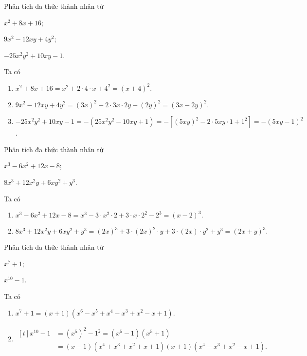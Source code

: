 \begin{vd}
	Phân tích đa thức thành nhân tử
	\begin{listEX}[3]
    	\item $x^2 + 8x + 16$;
    	\item $9x^2 - 12xy + 4y^2$;
    	\item $-25x^2y^2 + 10xy - 1$.
	\end{listEX}
	\loigiai 
	{
		Ta có
		\begin{enumerate}
			\item $x^2 + 8x + 16 = x^2 + 2 \cdot 4 \cdot x + 4^2 = (x+4)^2$.
			\item $9x^2 - 12xy + 4y^2 = (3x)^2 - 2 \cdot 3x \cdot 2y + (2y)^2 = (3x-2y)^2$.
			\item $-25x^2y^2 + 10xy - 1 = - \left(25x^2y^2 - 10xy + 1\right) = - \left[(5xy)^2 - 2 \cdot 5xy \cdot 1 + 1^2\right] = - (5xy - 1)^2$.
		\end{enumerate}
	}
\end{vd}



\begin{vd}
	Phân tích đa thức thành nhân tử
	\begin{listEX}[2]
    	\item $x^3 - 6x^2 + 12x - 8$;
    	\item $8x^3 + 12x^2y + 6xy^2 + y^3$.
	\end{listEX}
	\loigiai 
	{
		Ta có
		\begin{enumerate}
			\item $x^3 - 6x^2 + 12x - 8 = x^3 - 3 \cdot x^2 \cdot 2 + 3 \cdot x \cdot 2^2 -2^3 = (x-2)^3.$
			\item $8x^3 + 12x^2y + 6xy^2 + y^3 = (2x)^3 + 3 \cdot (2x)^2 \cdot y + 3 \cdot (2x) \cdot y^2 + y^3 = (2x+y)^3.$
		\end{enumerate}
	}
\end{vd}

\begin{vd}
	Phân tích đa thức thành nhân tử
	\begin{listEX}[2]
		\item $x^7 + 1$;
		\item $x^{10} - 1$.
	\end{listEX}
	\loigiai 
	{
		Ta có
		\begin{enumerate}
			\item $x^7 + 1 = (x+1)(x^6 - x^5 + x^4 - x^3 + x^2 - x + 1).$
			\item 
				$\begin{aligned}[t]
					x^{10} - 1 &= \left(x^5\right)^2 - 1^2 = \left(x^5 - 1\right)\left(x^5 + 1\right) \\
					&= (x-1)\left(x^4 + x^3 + x^2 + x + 1\right)(x+1)\left(x^4 - x^3 + x^2 - x + 1\right).
				\end{aligned}$
		\end{enumerate}
	}
\end{vd}

